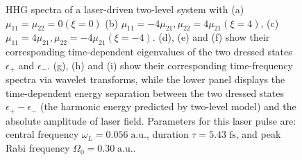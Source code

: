 \documentclass[10pt,letterpaper]{article}
\begin{document}
\begin{figure}[h]
	\caption{HHG spectra of a laser-driven two-level system with (a) $\mu_{11}=\mu_{22}=0 (\xi=0)$ (b) $\mu_{11}=-4\mu_{21},\mu_{22}=4\mu_{21} (\xi=4)$, (c) $\mu_{11}=4\mu_{21},\mu_{22}=-4\mu_{21} (\xi=-4)$. (d), (e) and (f) show their corresponding time-dependent eigenvalues of the two dressed states $\epsilon_{+}$ and $\epsilon_{-}$. (g), (h) and (i) show their corresponding time-frequency spectra via wavelet transforms, while the lower panel displays the time-dependent energy separation between the two dressed states $\epsilon_{+}-\epsilon_{-}$ (the harmonic energy predicted by two-level model) and the absolute amplitude of laser field. Parameters for this laser pulse are: central frequency $\omega_L=0.056\;\text{a.u.}$, duration $\tau=5.43\;\text{fs}$, and peak Rabi frequency $\Omega_0=0.30\;\text{a.u.}$.}
	\label{fig1}
\end{figure}
\end{document}
